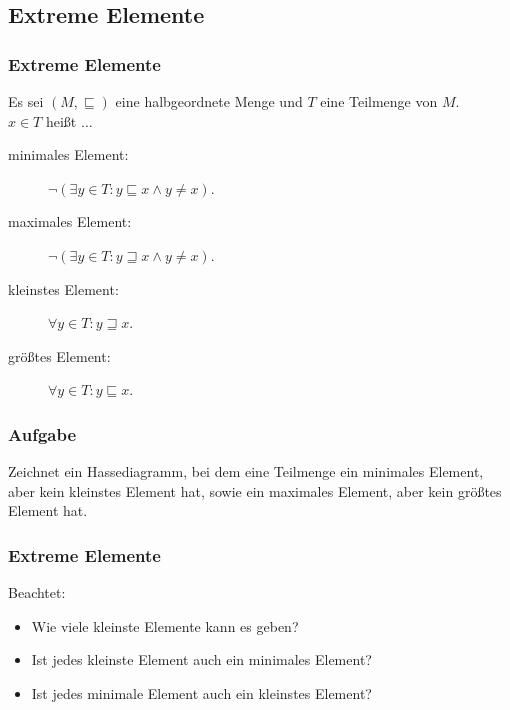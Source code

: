 \subsection{Extreme Elemente}
\begin{frame}
	\frametitle{Extreme Elemente}
	Es sei $(M,\sqsubseteq)$ eine halbgeordnete Menge und $T$ eine Teilmenge von $M$.\\
  $x \in T$ heißt $\dots$
	\begin{description}
		\item[minimales Element:] $\neg(\exists y\in T: y\sqsubseteq x \wedge y\neq x)$.
		\item[maximales Element:] $\neg(\exists y\in T: y\sqsupseteq x \wedge y\neq x)$.
		\item[kleinstes Element:] $\forall y\in T: y\sqsupseteq x$.
		\item[größtes Element:] $\forall y\in T: y\sqsubseteq x$.
	\end{description}
\end{frame}
\begin{frame}
	\frametitle{Aufgabe}
		Zeichnet ein Hassediagramm, bei dem eine Teilmenge ein minimales Element, aber kein kleinstes Element hat,
		sowie ein maximales Element, aber kein größtes Element hat.
\end{frame}
\begin{frame}
	\frametitle{Extreme Elemente}
	\begin{alertblock}{Beachtet:}
		\begin{itemize}
			\item Wie viele kleinste Elemente kann es geben? 
			\item Ist jedes kleinste Element auch ein minimales Element? 
			\item Ist jedes minimale Element auch ein kleinstes Element? 
		\end{itemize}
	\end{alertblock}
\end{frame}
